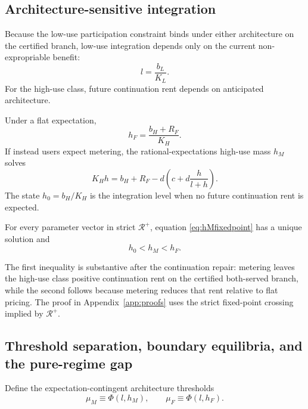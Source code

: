 \subsection{Architecture-sensitive integration}

Because the low-use participation constraint binds under either architecture on the certified branch, low-use integration depends only on the current non-expropriable benefit:
\begin{equation}
 l=\frac{b_L}{K_L}.
 \label{eq:lstate}
\end{equation}
For the high-use class, future continuation rent depends on anticipated architecture.

Under a flat expectation,
\begin{equation}
 h_F=\frac{b_H+R_F}{K_H}.
 \label{eq:hF}
\end{equation}
If instead users expect metering, the rational-expectations high-use mass $h_M$ solves
\begin{equation}
 K_H h=b_H+R_F-d\left(c+d\frac{h}{l+h}\right).
 \label{eq:hMfixedpoint}
\end{equation}
The state $h_0=b_H/K_H$ is the integration level when no future continuation rent is expected.

\begin{proposition}\label{prop:T1}
For every parameter vector in strict $\mathcal R^+$, equation \eqref{eq:hMfixedpoint} has a unique solution and
\begin{equation}
 h_0<h_M<h_F.
 \label{eq:T1}
\end{equation}
\end{proposition}

The first inequality is substantive after the continuation repair: metering leaves the high-use class positive continuation rent on the certified both-served branch, while the second follows because metering reduces that rent relative to flat pricing. The proof in Appendix~\ref{app:proofs} uses the strict fixed-point crossing implied by $\mathcal R^+$.

\subsection{Threshold separation, boundary equilibria, and the pure-regime gap}

Define the expectation-contingent architecture thresholds
\begin{equation}
 \mu_M\equiv\Phi(l,h_M),
 \qquad
 \mu_F\equiv\Phi(l,h_F).
 \label{eq:mu-thresholds}
\end{equation}

